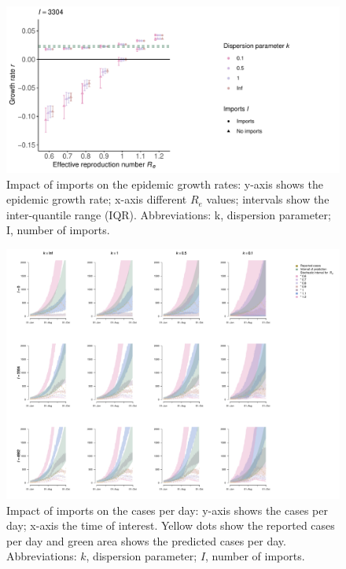 \documentclass[10pt, a4paper, twoside]{article}
\begin{document}
\begin{figure}[h]
\centering
\includegraphics[scale=0.5]{growth_r_imports_infect_reported_2021-02-24.pdf}
\caption{Impact of imports on the epidemic growth rates: y-axis shows the epidemic growth rate; x-axis different $R_e$ values; intervals show the inter-quantile range (IQR). Abbreviations: k, dispersion parameter; I, number of imports.}
\end{figure}
\begin{multicols}{2}

\end{multicols}
\begin{figure}[h]
\centering
\includegraphics[scale=0.4]{sim3_cases_d_imports_infect_2021-02-24.pdf}
\caption{Impact of imports on the cases per day: y-axis shows the cases per day; x-axis the time of interest. Yellow dots show the reported cases per day and green area shows the predicted cases per day. Abbreviations: $k$, dispersion parameter; $I$, number of imports.}
\end{figure}
\end{document}
